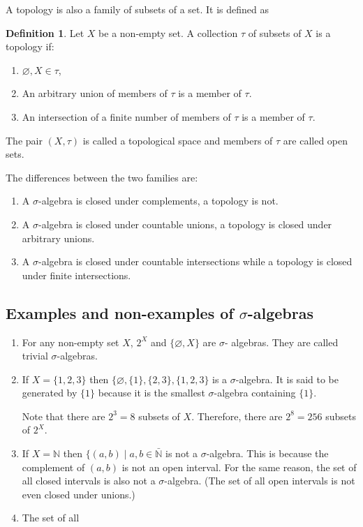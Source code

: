 \documentclass{article}
\newcommand{\son}{\mathbb{N}}
\theoremstyle{plain}
\numberwithin{thm}{section}
\theoremstyle{plain}
\numberwithin{prop}{section}
\theoremstyle{definition}
\newtheorem{defn}{Definition}
\numberwithin{defn}{section}
\theoremstyle{remark}
\numberwithin{equation}{section}
\begin{document}
A topology is also a family of subsets of a set. It is defined as
\begin{defn}\label{s1d3}
Let $X$ be a non-empty set. A collection $\tau$ of subsets of $X$ is a topology
if:
\begin{enumerate}
\item $\varnothing, X \in \tau$,
\item An arbitrary union of members of $\tau$ is a member of $\tau$.
\item An intersection of a finite number of members of $\tau$ is a member of $\tau$.
\end{enumerate}
The pair $(X, \tau)$ is called a topological space and members of $\tau$ are
called open sets.
\end{defn}
The differences between the two families are:
\begin{enumerate}
\item A $\sigma$-algebra is closed under complements, a topology is not.
\item A $\sigma$-algebra is closed under countable unions, a topology is closed
under arbitrary unions.
\item A $\sigma$-algebra is closed under countable intersections while a topology
is closed under finite intersections.
\end{enumerate}

\subsection{Examples and non-examples of $\sigma$-algebras}
\begin{enumerate}
\item For any non-empty set $X$, $2^X$ and $\{\varnothing, X\}$ are $\sigma$-
algebras. They are called trivial $\sigma$-algebras.
\item If $X = \{1, 2, 3\}$ then $\{\varnothing, \{1\}, \{2, 3\}, \{1, 2, 3\}$ is
a $\sigma$-algebra. It is said to be generated by $\{1\}$ because it is the 
smallest $\sigma$-algebra containing $\{1\}$. 

Note that there are $2^3 = 8$ subsets of $X$. Therefore, there are $2^8 = 256$
subsets of $2^X$.
\item If $X = \son$ then $\{(a, b)\;|\; a, b \in \bar{\son}$ is not
a $\sigma$-algebra. This is because the complement of $(a, b)$ is not an open
interval. For the same reason, the set of all closed intervals is also not a
$\sigma$-algebra. (The set of all open intervals is not even closed under unions.)
\item The set of all 
\end{enumerate}
\end{document}
